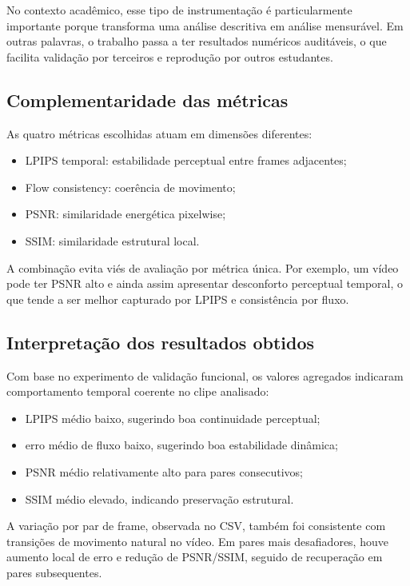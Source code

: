 \documentclass[conference]{IEEEtran}
\begin{document}
No contexto acadêmico, esse tipo de instrumentação é particularmente importante porque transforma uma análise descritiva em análise mensurável. Em outras palavras, o trabalho passa a ter resultados numéricos auditáveis, o que facilita validação por terceiros e reprodução por outros estudantes.

\subsection{Complementaridade das métricas}
As quatro métricas escolhidas atuam em dimensões diferentes:
\begin{itemize}
    \item LPIPS temporal: estabilidade perceptual entre frames adjacentes;
    \item Flow consistency: coerência de movimento;
    \item PSNR: similaridade energética pixelwise;
    \item SSIM: similaridade estrutural local.
\end{itemize}

A combinação evita viés de avaliação por métrica única. Por exemplo, um vídeo pode ter PSNR alto e ainda assim apresentar desconforto perceptual temporal, o que tende a ser melhor capturado por LPIPS e consistência por fluxo.

\subsection{Interpretação dos resultados obtidos}
Com base no experimento de validação funcional, os valores agregados indicaram comportamento temporal coerente no clipe analisado:
\begin{itemize}
    \item LPIPS médio baixo, sugerindo boa continuidade perceptual;
    \item erro médio de fluxo baixo, sugerindo boa estabilidade dinâmica;
    \item PSNR médio relativamente alto para pares consecutivos;
    \item SSIM médio elevado, indicando preservação estrutural.
\end{itemize}

A variação por par de frame, observada no CSV, também foi consistente com transições de movimento natural no vídeo. Em pares mais desafiadores, houve aumento local de erro e redução de PSNR/SSIM, seguido de recuperação em pares subsequentes.
\end{document}
